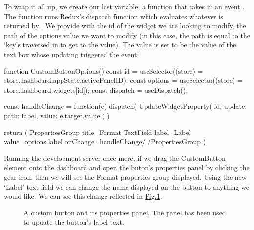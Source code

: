 \documentclass[letterpaper,10pt,english]{sphinxmanual}
\begin{document}
\sphinxAtStartPar
To wrap it all up, we create our last variable, a function that takes in an event . The function runs Redux’s dispatch function which evaluates whatever is returned by . We provide  with the id of the widget we are looking to modify, the path of the options value we want to modify (in this case, the path is equal to the ‘key’s traversed in   to get to the value). The value is set to be the value of the text box whose updating triggered the event:

%
\begin{sphinxVerbatim}[commandchars=\\\{\},numbers=left,firstnumber=1,stepnumber=1]
function CustomButtonOptions() \PYGZob{}
   const id = useSelector((store) =\PYGZgt{} store.dashboard.appState.activePanelID);
   const options = useSelector((store) =\PYGZgt{} store.dashboard.widgets[id]);
   const dispatch = useDispatch();

   const handleChange = function(e) \PYGZob{}
      dispatch(
            UpdateWidgetProperty(\PYGZob{}
               id,
               update: \PYGZob{}
                  path: \PYGZsq{}label\PYGZsq{},
                  value: e.target.value
               \PYGZcb{}
            \PYGZcb{})
      )
   \PYGZcb{}

   return (
      \PYGZlt{}PropertiesGroup title=\PYGZdq{}Format\PYGZdq{}\PYGZgt{}
         \PYGZlt{}TextField label=\PYGZdq{}Label\PYGZdq{} value=\PYGZob{}options.label\PYGZcb{} onChange=\PYGZob{}handleChange\PYGZcb{}/\PYGZgt{}
      \PYGZlt{}/PropertiesGroup\PYGZgt{}
   )
\PYGZcb{}
\end{sphinxVerbatim}
\sphinxresetverbatimhllines

\sphinxAtStartPar
Running the development server once more, if we drag the CustomButton element onto the dashboard and open the buton’s properties panel by clicking the gear icon, then we will see the Format properties group displayed. Using the new ‘Label’ text field we can change the name displayed on the button to anything we would like. We can see this change reflected in \hyperref[\detokenize{custom_component/formatting_options:formatting-options}]{Fig.\@ \ref{\detokenize{custom_component/formatting_options:formatting-options}}}.

\begin{figure}[htbp]
\centering
\capstart

\noindent{}
\caption{A custom button and its properties panel. The panel has been used to update the button’s label text.}\label{\detokenize{custom_component/formatting_options:id1}}\label{\detokenize{custom_component/formatting_options:formatting-options}}\end{figure}
\end{document}
